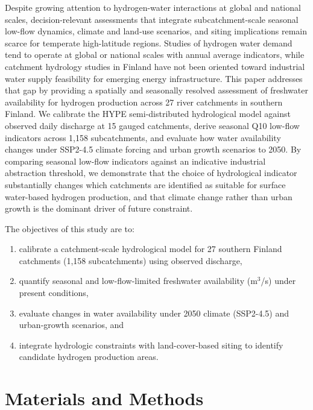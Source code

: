 \documentclass[draft]{agujournal2019}
\begin{document}
Despite growing attention to hydrogen-water interactions at global and national scales, decision-relevant assessments that integrate subcatchment-scale seasonal low-flow dynamics, climate and land-use scenarios, and siting implications remain scarce for temperate high-latitude regions. Studies of hydrogen water demand tend to operate at global or national scales with annual average indicators, while catchment hydrology studies in Finland have not been oriented toward industrial water supply feasibility for emerging energy infrastructure. This paper addresses that gap by providing a spatially and seasonally resolved assessment of freshwater availability for hydrogen production across 27 river catchments in southern Finland. We calibrate the HYPE semi-distributed hydrological model \cite{Lindstrom2010} against observed daily discharge at 15 gauged catchments, derive seasonal Q10 low-flow indicators across 1,158 subcatchments, and evaluate how water availability changes under SSP2-4.5 climate forcing and urban growth scenarios to 2050. By comparing seasonal low-flow indicators against an indicative industrial abstraction threshold, we demonstrate that the choice of hydrological indicator substantially changes which catchments are identified as suitable for surface water-based hydrogen production, and that climate change rather than urban growth is the dominant driver of future constraint.


The objectives of this study are to:
\begin{enumerate}
\item calibrate a catchment-scale hydrological model for 27 southern Finland catchments (1,158 subcatchments) using observed discharge,
\item quantify seasonal and low-flow-limited freshwater availability (m$^3$/s) under present conditions,
\item evaluate changes in water availability under 2050 climate (SSP2-4.5) and urban-growth scenarios, and
\item integrate hydrologic constraints with land-cover-based siting to identify candidate hydrogen production areas.
\end{enumerate}

\section{Materials and Methods}
\end{document}
